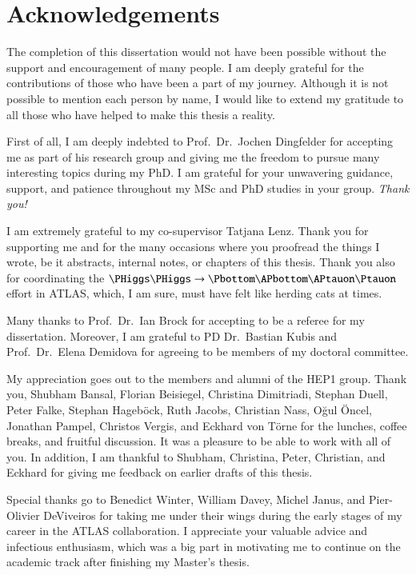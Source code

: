 \chapter{Acknowledgements}

The completion of this dissertation would not have been possible without the
support and encouragement of many people. I am deeply grateful for the
contributions of those who have been a part of my journey. Although it is not
possible to mention each person by name, I would like to extend my gratitude to
all those who have helped to make this thesis a reality.

First of all, I am deeply indebted to Prof.\ Dr.\ Jochen Dingfelder for
accepting me as part of his research group and giving me the freedom to pursue
many interesting topics during my PhD. I am grateful for your unwavering
guidance, support, and patience throughout my MSc and PhD studies in your
group. \emph{Thank you!}

I am extremely grateful to my co-supervisor Tatjana Lenz. Thank you for
supporting me and for the many occasions where you proofread the things I
wrote, be it abstracts, internal notes, or chapters of this thesis. Thank you
also for coordinating the $\HH \to \bbtautau$ effort in ATLAS, which, I am sure,
must have felt like herding cats at times.

Many thanks to Prof.\ Dr.\ Ian Brock for accepting to be a referee for my
dissertation. Moreover, I am grateful to PD Dr.\ Bastian Kubis and Prof.\ Dr.\
Elena Demidova for agreeing to be members of my doctoral committee.

My appreciation goes out to the members and alumni of the \textsc{HEP1}
group. Thank you, Shubham Bansal, Florian Beisiegel, Christina Dimitriadi,
Stephan Duell, Peter Falke, Stephan Hageböck, Ruth Jacobs, Christian Nass, Oğul
Öncel, Jonathan Pampel, Christos Vergis, and Eckhard von Törne for the lunches,
coffee breaks, and fruitful discussion. It was a pleasure to be able to work
with all of you. In addition, I am thankful to Shubham, Christina, Peter,
Christian, and Eckhard for giving me feedback on earlier drafts of this thesis.

Special thanks go to Benedict Winter, William Davey, Michel Janus, and
Pier-Olivier DeViveiros for taking me under their wings during the early stages
of my career in the ATLAS collaboration. I appreciate your valuable advice and
infectious enthusiasm, which was a big part in motivating me to continue on the
academic track after finishing my Master's thesis.

